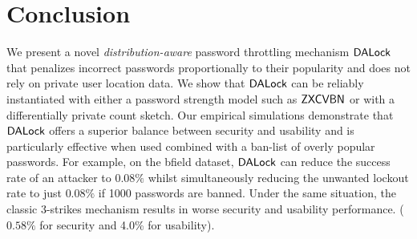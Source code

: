 \vspace*{-\baselineskip}
\vspace*{-\baselineskip}
\section{Conclusion}

\vspace*{-\baselineskip}
We present a novel {\em distribution-aware} password throttling mechanism $\mathsf{DALock}$ that penalizes incorrect passwords proportionally to their popularity and does not rely on private user location data. We show that $\mathsf{DALock}$ can be reliably instantiated with either a password strength model such as $\mathsf{ZXCVBN}$ or with a differentially private count sketch. Our empirical simulations demonstrate that $\mathsf{DALock}$ offers a superior balance between security and usability and is particularly effective when used combined with a ban-list of overly popular passwords. For example, on the bfield dataset, $\mathsf{DALock}$ can reduce the success rate of an attacker to $0.08\%$ whilst simultaneously reducing the unwanted lockout rate to just $0.08\%$ if 1000 passwords are banned. Under the same situation, the classic 3-strikes mechanism results in worse security and usability performance. ($0.58\%$ for security and 4.0\% for usability).

